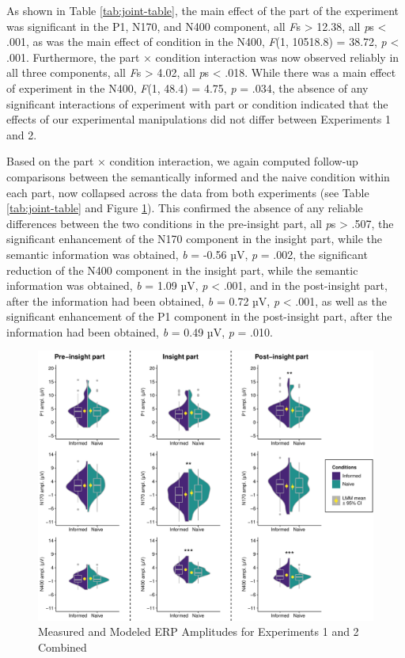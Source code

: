 \documentclass[
  english,
  man,floatsintext]{apa7}
\begin{document}
As shown in Table \ref{tab:joint-table}, the main effect of the part of the experiment was significant in the P1, N170, and N400 component, all \emph{F}s \textgreater{} 12.38, all \emph{p}s \textless{} .001, as was the main effect of condition in the N400, \emph{F}(1, 10518.8) = 38.72, \emph{p} \textless{} .001. Furthermore, the part × condition interaction was now observed reliably in all three components, all \emph{F}s \textgreater{} 4.02, all \emph{p}s \textless{} .018. While there was a main effect of experiment in the N400, \emph{F}(1, 48.4) = 4.75, \emph{p} = .034, the absence of any significant interactions of experiment with part or condition indicated that the effects of our experimental manipulations did not differ between Experiments 1 and 2.

Based on the part × condition interaction, we again computed follow-up comparisons between the semantically informed and the naive condition within each part, now collapsed across the data from both experiments (see Table \ref{tab:joint-table} and Figure \ref{fig:joint-plot}). This confirmed the absence of any reliable differences between the two conditions in the pre-insight part, all \emph{p}s \textgreater{} .507, the significant enhancement of the N170 component in the insight part, while the semantic information was obtained, \emph{b} = -0.56 µV, \emph{p} = .002, the significant reduction of the N400 component in the insight part, while the semantic information was obtained, \emph{b} = 1.09 µV, \emph{p} \textless{} .001, and in the post-insight part, after the information had been obtained, \emph{b} = 0.72 µV, \emph{p} \textless{} .001, as well as the significant enhancement of the P1 component in the post-insight part, after the information had been obtained, \emph{b} = 0.49 µV, \emph{p} = .010.



\begin{figure}

{\centering \includegraphics[width=1\linewidth]{manuscript_files/figure-latex/joint-plot-1} 

}

\caption{Measured and Modeled ERP Amplitudes for Experiments 1 and 2 Combined\smallskip}\label{fig:joint-plot}
\end{figure}
\end{document}
